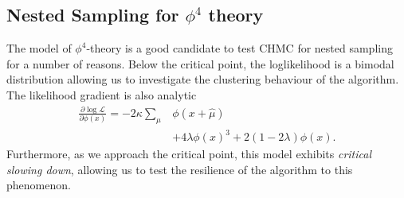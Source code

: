 \documentclass[11pt]{article}
\begin{document}
    \subsection{Nested Sampling for $\phi^4$ theory}\label{subsec:nested-sampling-phi4}
    The model of $\phi^4$-theory is a good candidate to test CHMC for nested sampling for a number of reasons.
    Below the critical point, the loglikelihood is a bimodal distribution allowing us to investigate the clustering
    behaviour of the algorithm.
    The likelihood gradient is also analytic
    \begin{equation}\label{eq:grad_likelihood}
    \begin{aligned}
        \frac{\partial \log{\mathcal{L}}} {\partial \phi(x)} = -2\kappa \sum\limits_{\mu} &\phi(x+\hat{\mu}) \\
        &+ 4\lambda \phi(x)^3 + 2(1-2\lambda)\phi(x).
    \end{aligned}
    \end{equation}
    Furthermore, as we approach the critical point, this model exhibits \emph{critical slowing down}, allowing us to
    test the resilience of the algorithm to this phenomenon.
\end{document}
